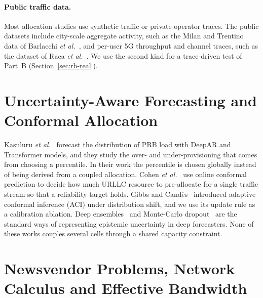 \paragraph{Public traffic data.} Most allocation studies use synthetic traffic or private operator traces. The public datasets include city-scale aggregate activity, such as the Milan and Trentino data of Barlacchi \emph{et al.}~\cite{barlacchi2015}, and per-user 5G throughput and channel traces, such as the dataset of Raca \emph{et al.}~\cite{raca2020beyond}. We use the second kind for a trace-driven test of Part~B (Section~\ref{sec:rb-real}).

\section{Uncertainty-Aware Forecasting and Conformal Allocation}
\label{sec:lit-unc}

Kasuluru \emph{et al.}~\cite{kasuluru2024} forecast the distribution of PRB load with DeepAR and Transformer models, and they study the over- and under-provisioning that comes from choosing a percentile. In their work the percentile is chosen globally instead of being derived from a coupled allocation. Cohen \emph{et al.}~\cite{cohen2023} use online conformal prediction to decide how much URLLC resource to pre-allocate for a single traffic stream so that a reliability target holds. Gibbs and Cand\`es~\cite{gibbs2021} introduced adaptive conformal inference (ACI) under distribution shift, and we use its update rule as a calibration ablation. Deep ensembles~\cite{lakshminarayanan2017} and Monte-Carlo dropout~\cite{gal2016} are the standard ways of representing epistemic uncertainty in deep forecasters. None of these works couples several cells through a shared capacity constraint.

\section{Newsvendor Problems, Network Calculus and Effective Bandwidth}
\label{sec:lit-nv}

